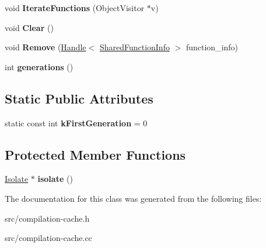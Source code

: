 \begin{DoxyCompactItemize}
\item 
\hypertarget{classv8_1_1internal_1_1_compilation_sub_cache_abe652de54c8b1abb6210ddfc513b28cb}{}void {\bfseries Iterate\+Functions} (Object\+Visitor $\ast$v)\label{classv8_1_1internal_1_1_compilation_sub_cache_abe652de54c8b1abb6210ddfc513b28cb}

\item 
\hypertarget{classv8_1_1internal_1_1_compilation_sub_cache_a9d3e099a1911e1e7a836b7df82d2e03b}{}void {\bfseries Clear} ()\label{classv8_1_1internal_1_1_compilation_sub_cache_a9d3e099a1911e1e7a836b7df82d2e03b}

\item 
\hypertarget{classv8_1_1internal_1_1_compilation_sub_cache_a3fd0a729c12e76a804fc2fe3145ffd56}{}void {\bfseries Remove} (\hyperlink{classv8_1_1internal_1_1_handle}{Handle}$<$ \hyperlink{classv8_1_1internal_1_1_shared_function_info}{Shared\+Function\+Info} $>$ function\+\_\+info)\label{classv8_1_1internal_1_1_compilation_sub_cache_a3fd0a729c12e76a804fc2fe3145ffd56}

\item 
\hypertarget{classv8_1_1internal_1_1_compilation_sub_cache_aa52ea32923a9315f2737467f210b8704}{}int {\bfseries generations} ()\label{classv8_1_1internal_1_1_compilation_sub_cache_aa52ea32923a9315f2737467f210b8704}

\end{DoxyCompactItemize}
\subsection*{Static Public Attributes}
\begin{DoxyCompactItemize}
\item 
\hypertarget{classv8_1_1internal_1_1_compilation_sub_cache_ac9d60da247fabc94383eabd9825fc203}{}static const int {\bfseries k\+First\+Generation} = 0\label{classv8_1_1internal_1_1_compilation_sub_cache_ac9d60da247fabc94383eabd9825fc203}

\end{DoxyCompactItemize}
\subsection*{Protected Member Functions}
\begin{DoxyCompactItemize}
\item 
\hypertarget{classv8_1_1internal_1_1_compilation_sub_cache_ade6feffbd1eb87a71e3bcfabe1d675d6}{}\hyperlink{classv8_1_1internal_1_1_isolate}{Isolate} $\ast$ {\bfseries isolate} ()\label{classv8_1_1internal_1_1_compilation_sub_cache_ade6feffbd1eb87a71e3bcfabe1d675d6}

\end{DoxyCompactItemize}


The documentation for this class was generated from the following files\+:\begin{DoxyCompactItemize}
\item 
src/compilation-\/cache.\+h\item 
src/compilation-\/cache.\+cc\end{DoxyCompactItemize}
